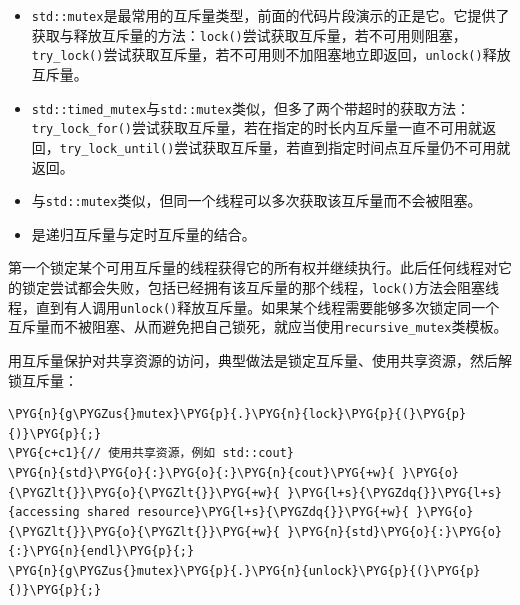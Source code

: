 \begin{itemize}
\item \texttt{std::\allowbreak{}mutex}是最常用的互斥量类型，前面的代码片段演示的正是它。它提供了获取与释放互斥量的方法：\texttt{lock()}尝试获取互斥量，若不可用则阻塞，\texttt{try\_\allowbreak{}lock()}尝试获取互斥量，若不可用则不加阻塞地立即返回，\texttt{unlock()}释放互斥量。



\item \texttt{std::\allowbreak{}timed\_\allowbreak{}mutex}与\texttt{std::\allowbreak{}mutex}类似，但多了两个带超时的获取方法：\texttt{try\_\allowbreak{}lock\_\allowbreak{}for()}尝试获取互斥量，若在指定的时长内互斥量一直不可用就返回，\texttt{try\_\allowbreak{}lock\_\allowbreak{}until()}尝试获取互斥量，若直到指定时间点互斥量仍不可用就返回。



\item {}与\texttt{std::\allowbreak{}mutex}类似，但同一个线程可以多次获取该互斥量而不会被阻塞。



\item {}是递归互斥量与定时互斥量的结合。

\end{itemize}



第一个锁定某个可用互斥量的线程获得它的所有权并继续执行。此后任何线程对它的锁定尝试都会失败，包括已经拥有该互斥量的那个线程，\texttt{lock()}方法会阻塞线程，直到有人调用\texttt{unlock()}释放互斥量。如果某个线程需要能够多次锁定同一个互斥量而不被阻塞、从而避免把自己锁死，就应当使用\texttt{recursive\_\allowbreak{}mutex}类模板。



用互斥量保护对共享资源的访问，典型做法是锁定互斥量、使用共享资源，然后解锁互斥量：



\begin{codeblockbg}
\begin{Verbatim}[commandchars=\\\{\},breaklines=true,breakanywhere=true,fontsize=\codefont,xleftmargin=17bp]
\PYG{n}{g\PYGZus{}mutex}\PYG{p}{.}\PYG{n}{lock}\PYG{p}{(}\PYG{p}{)}\PYG{p}{;}
\PYG{c+c1}{// 使用共享资源，例如 std::cout}
\PYG{n}{std}\PYG{o}{:}\PYG{o}{:}\PYG{n}{cout}\PYG{+w}{ }\PYG{o}{\PYGZlt{}}\PYG{o}{\PYGZlt{}}\PYG{+w}{ }\PYG{l+s}{\PYGZdq{}}\PYG{l+s}{accessing shared resource}\PYG{l+s}{\PYGZdq{}}\PYG{+w}{ }\PYG{o}{\PYGZlt{}}\PYG{o}{\PYGZlt{}}\PYG{+w}{ }\PYG{n}{std}\PYG{o}{:}\PYG{o}{:}\PYG{n}{endl}\PYG{p}{;}
\PYG{n}{g\PYGZus{}mutex}\PYG{p}{.}\PYG{n}{unlock}\PYG{p}{(}\PYG{p}{)}\PYG{p}{;}
\end{Verbatim}
\end{codeblockbg}


